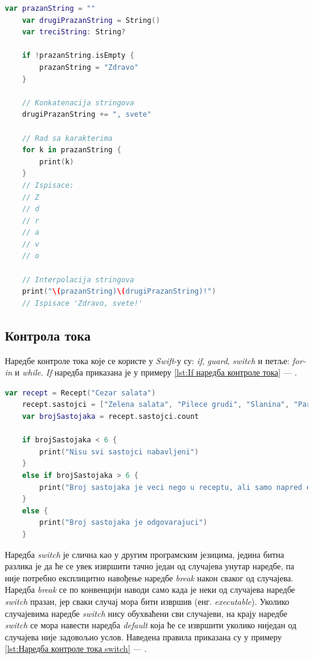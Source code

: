 \documentclass[12pt,oneside]{memoir}
\begin{document}
\begin{lstlisting}[caption=\textit{{Операције над стринговима}}, label={lst:Операције над стринговима}, language=Swift, frame=single]
    var prazanString = ""
    var drugiPrazanString = String()
    var treciString: String?
    
    if !prazanString.isEmpty {
        prazanString = "Zdravo"
    }
    
    // Konkatenacija stringova
    drugiPrazanString += ", svete"
    
    // Rad sa karakterima
    for k in prazanString {
        print(k)
    }
    // Ispisace: 
    // Z
    // d
    // r
    // a
    // v
    // o
    
    // Interpolacija stringova
    print("\(prazanString)\(drugiPrazanString)!")
    // Ispisace 'Zdravo, svete!'
\end{lstlisting}

\subsection{Контрола тока}
\label{subsec:Контрола тока}

\indent Наредбе контроле тока које се користе у \textit{Swift}-у су: \textit{if}, \textit{guard}, \textit{switch} и петље: \textit{for-in} и \textit{while}. \textit{If} наредба приказана је у примеру \ref{lst:If наредба контроле тока} --- .

\begin{lstlisting}[caption=\textit{{If наредбa контроле тока}}, label={lst:If наредба контроле тока}, language=Swift, frame=single]
    var recept = Recept("Cezar salata")
    recept.sastojci = ["Zelena salata", "Pilece grudi", "Slanina", "Paradajz", "Hleb", "Cezar premaz"]
    var brojSastojaka = recept.sastojci.count
    
    if brojSastojaka < 6 {
        print("Nisu svi sastojci nabavljeni")
    }
    else if brojSastojaka > 6 {
        print("Broj sastojaka je veci nego u receptu, ali samo napred eksperimentisi")
    }
    else {
        print("Broj sastojaka je odgovarajuci")
    }
\end{lstlisting}

\indent Наредба \textit{switch} је слична као у другим програмским језицима, једина битна разлика је да ће се увек извршити тачно један од случајева унутар наредбе, па није потребно експлицитно навођење наредбе \textit{break} након сваког од случајева. Наредба \textit{break} се по конвенцији наводи само када је неки од случајева наредбе \textit{switch} празан, јер сваки случај мора бити извршив (енг. \textit{executable}). Уколико случајевима наредбе \textit{switch} нису обухваћени сви случајеви, на крају наредбе \textit{switch} се мора навести наредба \textit{default} која ће се извршити уколико ниједан од случајева није задовољио услов.  Наведена правила приказана су у примеру \ref{lst:Наредба контроле тока switch} --- .
\end{document}
